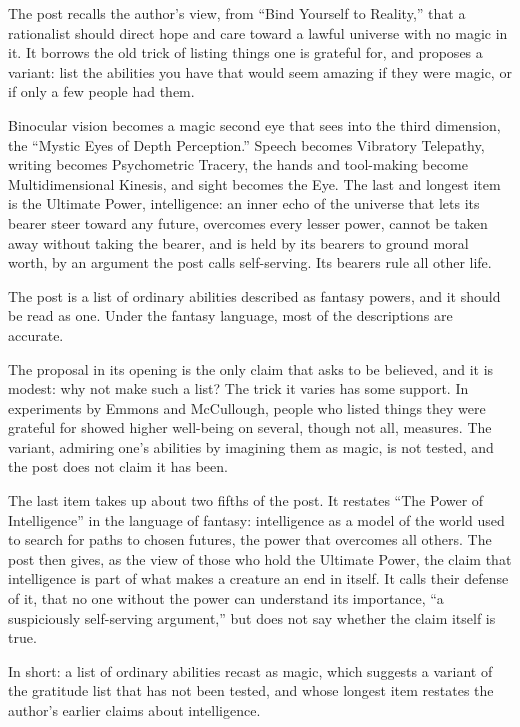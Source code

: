 \begin{afterword}
\summaryhead

The post recalls the author's view, from ``Bind Yourself to Reality,'' that a rationalist should direct hope and care toward a lawful universe with no magic in it. It borrows the old trick of listing things one is grateful for, and proposes a variant: list the abilities you have that would seem amazing if they were magic, or if only a few people had them.

Binocular vision becomes a magic second eye that sees into the third dimension, the ``Mystic Eyes of Depth Perception.'' Speech becomes Vibratory Telepathy, writing becomes Psychometric Tracery, the hands and tool-making become Multidimensional Kinesis, and sight becomes the Eye. The last and longest item is the Ultimate Power, intelligence: an inner echo of the universe that lets its bearer steer toward any future, overcomes every lesser power, cannot be taken away without taking the bearer, and is held by its bearers to ground moral worth, by an argument the post calls self-serving. Its bearers rule all other life.

\responsehead

The post is a list of ordinary abilities described as fantasy powers, and it should be read as one. Under the fantasy language, most of the descriptions are accurate.

The proposal in its opening is the only claim that asks to be believed, and it is modest: why not make such a list? The trick it varies has some support. In experiments by Emmons and McCullough, people who listed things they were grateful for showed higher well-being on several, though not all, measures. The variant, admiring one's abilities by imagining them as magic, is not tested, and the post does not claim it has been.

The last item takes up about two fifths of the post. It restates ``The Power of Intelligence'' in the language of fantasy: intelligence as a model of the world used to search for paths to chosen futures, the power that overcomes all others. The post then gives, as the view of those who hold the Ultimate Power, the claim that intelligence is part of what makes a creature an end in itself. It calls their defense of it, that no one without the power can understand its importance, ``a suspiciously self-serving argument,'' but does not say whether the claim itself is true.

In short: a list of ordinary abilities recast as magic, which suggests a variant of the gratitude list that has not been tested, and whose longest item restates the author's earlier claims about intelligence.
\end{afterword}
